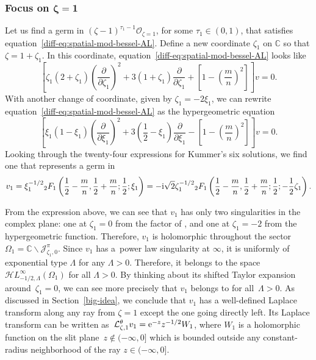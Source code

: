 \documentclass[pdftex]{sigma}
\newcommand{\singexp}[2]{\mathcal{H}L^\infty_{#1, #2}}
\newcommand{\C}{\mathbb{C}}
\newcommand{\laplace}{\mathcal{L}}
\numberwithin{equation}{section}
\begin{document}
\subsubsection[Focus on zeta = 1]{Focus on $\boldsymbol{\zeta = 1}$}\label{pos-root-AL}
%
Let us find a germ in $(\zeta-1)^{\tau_1-1} \mathcal{O}_{\zeta=1}$, for some $\tau_1 \in (0, 1)$, that satisfies equation~\eqref{diff-eq:spatial-mod-bessel-AL}. Define a new coordinate $\zeta_1$ on $\C$ so that $\zeta = 1 + \zeta_1$. In this coordinate, equation~\eqref{diff-eq:spatial-mod-bessel-AL} looks like
\[%
\left[\zeta_1(2 + \zeta_1) \left(\frac{\partial}{\partial \zeta_1}\right)^2 + 3(1 + \zeta_1) \frac{\partial}{\partial \zeta_1} + \left[1 - \left(\frac{m}{n}\right)^2\right]\right] v = 0.
\]
With another change of coordinate, given by $\zeta_1 = -2\xi_1$, we can rewrite equation~\eqref{diff-eq:spatial-mod-bessel-AL} as the hypergeometric equation
\[%
\left[\xi_1 (1 - \xi_1) \left(\frac{\partial}{\partial \xi_1}\right)^2 + 3(\frac{1}{2} - \xi_1) \frac{\partial}{\partial \xi_1} - \left[1 - \left(\frac{m}{n}\right)^2\right]\right] v = 0.
\]
Looking through the twenty-four expressions for Kummer's six solutions, we find one \cite[formula~(15.10.12)]{dlmf} that represents a germ in 
\begin{gather*}
v_1 = \xi_1^{-1/2} {}_2F_1\left(\frac{1}{2}-\frac{m}{n}, \frac{1}{2}+\frac{m}{n}; \frac{1}{2}; \xi_1\right) = -{\rm i}\sqrt{2} \zeta_1^{-1/2} {}_2F_1\left(\frac{1}{2}-\frac{m}{n}, \frac{1}{2}+\frac{m}{n}; \frac{1}{2}; -\frac{1}{2}\zeta_1\right).
\end{gather*}

From the expression above, we can see that $v_1$ has only two singularities in the complex plane: one at $\zeta_1 = 0$ from the factor of , and one at $\zeta_1 = -2$ from the hypergeometric function. Therefore, $v_1$ is holomorphic throughout the sector $\Omega_1 = \C \smallsetminus \mathcal{J}^\pi_{\zeta_1, 0}$. Since $v_1$ has a~power law singularity at $\infty$, it is uniformly of exponential type $\Lambda$ for any $\Lambda > 0$. Therefore, it belongs to the space $\singexp{-1/2}{\Lambda}(\Omega_1)$ for all $\Lambda > 0$. By thinking about its shifted Taylor expansion around~${\zeta_1 = 0}$, we can see more precisely that $v_1$ belongs to
\smash{$ -{\rm i}\sqrt{2} \zeta_1^{-1/2} + \singexp{1/2}{\Lambda}(\Omega_1) $}
for all~${\Lambda > 0}$. As discussed in Section~\ref{big-idea}, we conclude that $v_1$ has a well-defined Laplace transform along any ray from $\zeta = 1$ except the one going directly left. Its Laplace transform can be written as~${\laplace^\theta_{\zeta, 1} v_1 = {\rm e}^{-z} z^{-1/2} W_1}$,
where $W_1$ is a holomorphic function on the slit plane~${z \notin (-\infty, 0]}$ which is bounded outside any constant-radius neighborhood of the ray $z \in (-\infty, 0]$.
%
\end{document}
